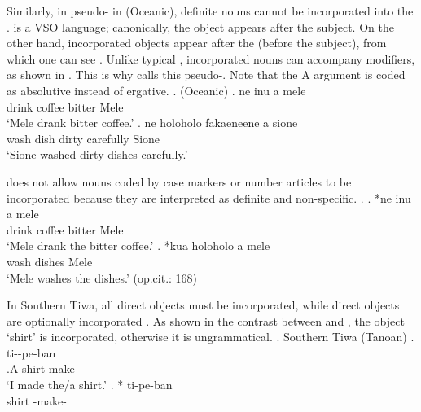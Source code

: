 Similarly, in pseudo- in  (Oceanic),
definite nouns cannot be incorporated into the .
 is a VSO language;
canonically, the object appears after the subject.
On the other hand,
incorporated objects appear after the  (before the subject),
from which one can see .
Unlike typical ,
incorporated nouns can accompany modifiers,
as shown in \Next.
This is why  calls this pseudo-.
Note that the A argument  is coded as absolutive instead of ergative.
%
\ex.  (Oceanic)
 \ag. ne inu   a mele \\
       drink coffee bitter  Mele \\
      `Mele drank bitter coffee.'
 \bg. ne holoholo   fakaeneene a sione \\
       wash dish dirty carefully  Sione \\
      `Sione washed dirty dishes carefully.'
  \hfill{\cite[158]{massam01}}

 does not allow nouns coded by case markers or number articles
to be incorporated
because they are interpreted as definite and non-specific.
%
\ex.
 \ag. *ne inu    a mele \\
       drink  coffee bitter  Mele \\
      `Mele drank the bitter coffee.'
 \bg. *kua holoholo   a mele \\
        wash  dishes  Mele \\
       `Mele washes the dishes.'
 \hfill{(op.cit.: 168)}

In Southern Tiwa,
all  direct objects must be incorporated,
while  direct objects are optionally incorporated \cite{allenetal84}.
As shown in the contrast between \Next[a] and \Next[b],
the  object  `shirt' is incorporated,
otherwise it is ungrammatical.
%
\ex. Southern Tiwa (Tanoan)
 \ag. ti--pe-ban \\
      .{\sc A}-shirt-make-\\
      `I made the/a shirt.'
 \bg. * ti-pe-ban \\
      shirt -make-\\
      \hfill{\cite[293]{allenetal84}}

